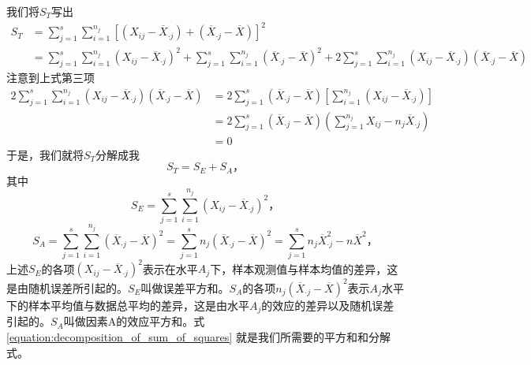 我们将$ S_T $写出
\begin{equation}
	\begin{aligned}
		S_T &= \sum_{j=1}^{s}\sum_{i=1}^{n_j}\left[ (X_{ij} - \overline{X}_{\cdot j}) + (\overline{X}_{\cdot j} - \overline{X}) \right]^{2} \\
		&= \sum_{j=1}^{s}\sum_{i=1}^{n_j}(X_{ij} - \overline{X}_{\cdot j})^2 + \sum_{j=1}^{s}\sum_{i=1}^{n_j}(\overline{X}_{\cdot j} - \overline{X})^2 + 2 \sum_{j=1}^{s}\sum_{i=1}^{n_j}(X_{ij} - \overline{X}_{\cdot j})(\overline{X}_{\cdot j} - \overline{X})
	\end{aligned}
\end{equation}
注意到上式第三项
\begin{equation}
	\begin{aligned}
		2 \sum_{j=1}^{s}\sum_{i=1}^{n_j}(X_{ij} - \overline{X}_{\cdot j})(\overline{X}_{\cdot j} - \overline{X}) &= 2 \sum_{j=1}^{s}(\overline{X}_{\cdot j} - \overline{X})\left[ \sum_{i=1}^{n_j}(X_{ij} - \overline{X}_{\cdot j}) \right] \\
		&= 2 \sum_{j=1}^{s}(\overline{X}_{\cdot j} - \overline{X})(\sum_{j=1}^{n_j}X_{ij} - n_{j}\overline{X}_{\cdot j}) \\
		&= 0
	\end{aligned}
\end{equation}
于是，我们就将$ S_T $分解成我
\begin{equation} \label{equation:decomposition_of_sum_of_squares}
	S_T = S_E + S_A \text{，}
\end{equation}
其中
\begin{equation}
	S_E = \sum_{j=1}^{s}\sum_{i=1}^{n_j}\left( X_{ij} - \overline{X}_{\cdot j}\right)^2  \text{，}
\end{equation}
\begin{equation}
	S_A = \sum_{j=1}^{s}\sum_{i=1}^{n_j}\left( \overline{X}_{\cdot j} - \overline{X}\right)^2 = \sum_{j=1}^{s}n_{j}\left( \overline{X}_{\cdot j} - \overline{X}\right) ^2 = \sum_{j=1}^{s}n_{j}\overline{X}_{\cdot j}^{2} - n\overline{X}^2 \text{，}
\end{equation}
上述$ S_E $的各项$ (X_{ij} - \overline{X}_{\cdot j})^{2} $表示在水平$ A_j $下，样本观测值与样本均值的差异，这是由随机误差所引起的。$ S_E $叫做误差平方和。$ S_A $的各项$ n_j(\overline{X}_{\cdot j} - \overline{X})^2 $表示$ A_j $水平下的样本平均值与数据总平均的差异，这是由水平$ A_j $的效应的差异以及随机误差引起的。$ S_A $叫做因素A的效应平方和。式 \ref{equation:decomposition_of_sum_of_squares}  就是我们所需要的平方和和分解式。

